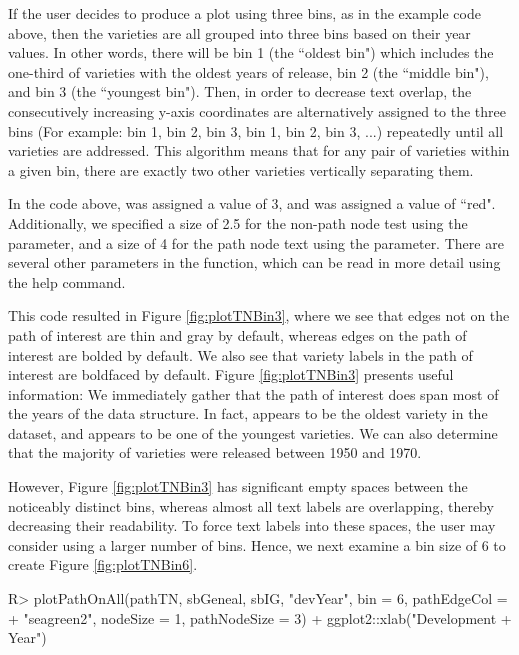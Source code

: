 \documentclass[article,shortnames]{jss}
\begin{document}
If the user decides to produce a plot using three bins, as in the example code above, then the varieties are all grouped into three bins based on their year values. In other words, there will be bin 1 (the ``oldest bin") which includes the one-third of varieties with the oldest years of release, bin 2 (the ``middle bin"), and bin 3 (the ``youngest bin"). Then, in order to decrease text overlap, the consecutively increasing y-axis coordinates are alternatively assigned to the three bins (For example: bin 1, bin 2, bin 3, bin 1, bin 2, bin 3, ...) repeatedly until all varieties are addressed. This algorithm means that for any pair of varieties within a given bin, there are exactly two other varieties vertically separating them.

\clearpage

In the code above,  was assigned a value of 3, and  was assigned a value of ``red". Additionally, we specified a size of 2.5 for the non-path node test using the  parameter, and a size of 4 for the path node text using the  parameter. There are several other parameters in the  function, which can be read in more detail using the help command.

This code resulted in Figure \ref{fig:plotTNBin3}, where we see that edges not on the path of interest are thin and gray by default, whereas edges on the path of interest are bolded by default. We also see that variety labels in the path of interest are boldfaced by default. Figure \ref{fig:plotTNBin3} presents useful information: We immediately gather that the path of interest does span most of the years of the data structure. In fact,  appears to be the oldest variety in the dataset, and  appears to be one of the youngest varieties. We can also determine that the majority of varieties were released between 1950 and 1970.

However, Figure \ref{fig:plotTNBin3} has significant empty spaces between the noticeably distinct bins, whereas almost all text labels are overlapping, thereby decreasing their readability. To force text labels into these spaces, the user may consider using a larger number of bins. Hence, we next examine a bin size of 6 to create Figure \ref{fig:plotTNBin6}.

\begin{Code}
R> plotPathOnAll(pathTN, sbGeneal, sbIG, "devYear", bin = 6, pathEdgeCol =
+    "seagreen2", nodeSize = 1, pathNodeSize = 3) + ggplot2::xlab("Development
+    Year")
\end{Code}
\end{document}
